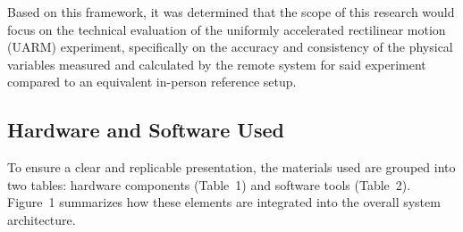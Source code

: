 \documentclass[sensors,article,submit,pdftex]{Definitions/mdpi}
\begin{document}
Based on this framework, it was determined that the scope of this research would focus on the technical evaluation of the uniformly accelerated rectilinear motion (UARM) experiment, specifically on the accuracy and consistency of the physical variables measured and calculated by the remote system for said experiment compared to an equivalent in-person reference setup.

\subsection{Hardware and Software Used}

To ensure a clear and replicable presentation, the materials used are grouped into two tables: hardware components (Table~1) and software tools (Table~2). Figure~1 summarizes how these elements are integrated into the overall system architecture.
\end{document}
